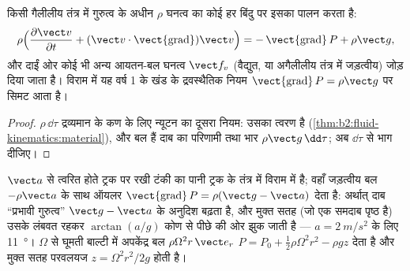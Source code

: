 \begin{theorem}\label{thm:b2:euler-bernoulli:euler}
किसी गैलीलीय तंत्र में गुरुत्व के अधीन $\rho$ घनत्व का कोई 
हर बिंदु पर इसका पालन करता है:
\[
\rho\Bigl(\frac{\partial\vect v}{\partial t} + (\vect v\cdot\operatorname{\vect{grad}})
\vect v\Bigr) = -\operatorname{\vect{grad}}P + \rho\vect g ,
\]
और दाईं ओर कोई भी अन्य आयतन-बल घनत्व $\vect f_v$ (वैद्युत, या
अगैलीलीय तंत्र में जड़त्वीय) जोड़ दिया जाता है। विराम में यह
वर्ष 1 के खंड के द्रवस्थैतिक नियम $\operatorname{\vect{grad}}P = \rho\vect g$
पर सिमट आता है।
\end{theorem}

\begin{proof}
$\rho\,\dd\tau$ द्रव्यमान के कण के लिए न्यूटन का दूसरा नियम: उसका
त्वरण  है
(\cref{thm:b2:fluid-kinematics:material}), और बल हैं दाब का
परिणामी तथा भार $\rho\vect g\,\dd\tau$; अब $\dd\tau$ से भाग दीजिए।
\end{proof}

\begin{example}[त्वरित होती टंकी]\label{ex:b2:euler-bernoulli:tank}
$\vect a$ से त्वरित होते ट्रक पर रखी टंकी का पानी ट्रक के तंत्र में
विराम में है; वहाँ जड़त्वीय बल $-\rho\vect a$ के साथ ऑयलर
$\operatorname{\vect{grad}}P = \rho(\vect g - \vect a)$ देता है: अर्थात् दाब
``प्रभावी गुरुत्व'' $\vect g - \vect a$ के अनुदिश बढ़ता है, और मुक्त
सतह (जो एक समदाब पृष्ठ है) उसके लंबवत रहकर
$\arctan(a/g)$ कोण से पीछे की ओर झुक जाती है --- $a = \qty{2}{m/s^2}$ के लिए \qty{11}{\degree}।
$\Omega$ से घूमती बाल्टी में अपकेंद्र बल $\rho\Omega^2r\,\vect e_r$
$P = P_0 + \tfrac12\rho\Omega^2r^2 - \rho gz$ देता है और मुक्त सतह
परवलयज $z = \Omega^2r^2/2g$ होती है।
\end{example}

